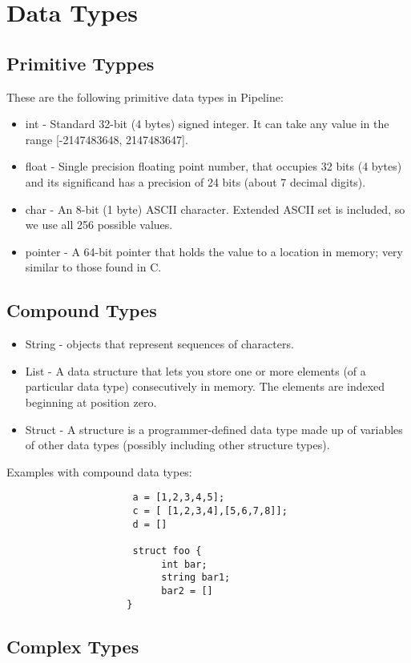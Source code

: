 \documentclass[./LRM_main.tex]{subfiles}
\begin{document}


\chapter{Data Types}



\section{Primitive Typpes}
These are the following primitive data types in Pipeline:
\begin{itemize}
    \item int -  Standard 32-bit (4 bytes) signed integer. It can take any value in the range [-2147483648, 2147483647].
    \item float - Single precision floating point number, that occupies 32 bits (4 bytes) and its significand has a precision of 24 bits (about 7 decimal digits). 
    \item char - An 8-bit (1 byte) ASCII character. Extended ASCII set is included, so we use all 256 possible values.
    \item pointer - A 64-bit pointer that holds the value to a location in memory; very similar to those found in C.
\end{itemize}

\section{Compound Types}
\begin{itemize}
    \item String - objects that represent sequences of characters. 
    \item List - A data structure that lets you store one or more elements (of a particular data type) consecutively in memory. The elements are indexed beginning at position zero. 
    \item Struct - A structure is a programmer-defined data type made up of variables of other data types (possibly including other structure types).
\end{itemize}

Examples with compound data types:
\begin{lstlisting}
                      a = [1,2,3,4,5];
		              c = [ [1,2,3,4],[5,6,7,8]];
		              d = []
		              
		              struct foo {
			               int bar;
			               string bar1;
			               bar2 = []
                     }

\end{lstlisting}

\section{Complex Types}
\end{document}
